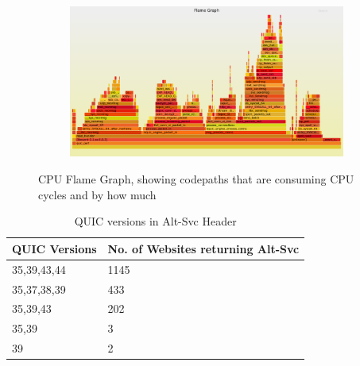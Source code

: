 \begin{frame}

\begin{figure}[!htb]
    \centering
    \begin{subfigure}{1\textwidth}
        \includegraphics[width=\linewidth]{./plots/perf_flame_graphs/quic/kernel.png}
    \end{subfigure}
    
    \caption{CPU Flame Graph, showing codepaths that are consuming CPU cycles and by how much}\label{fig:cpu-flame-graph-}
\end{figure}

\end{frame}
\clearpage

\begin{frame}

\begin{table}[ht]
    \begin{tabular}{@{}|l|l|@{}}
        \toprule
        \textbf{QUIC Versions} & \textbf{No. of Websites returning Alt-Svc} \\ \midrule
        35,39,43,44            & 1145                                       \\ \midrule
        35,37,38,39            & 433                                        \\ \midrule
        35,39,43               & 202                                        \\ \midrule
        35,39                  & 3                                          \\ \midrule
        39                     & 2                                          \\ \bottomrule
    \end{tabular}
    \caption{QUIC versions in Alt-Svc Header}\label{fig:quic-versions-in}
\end{table}

\end{frame}
\clearpage

